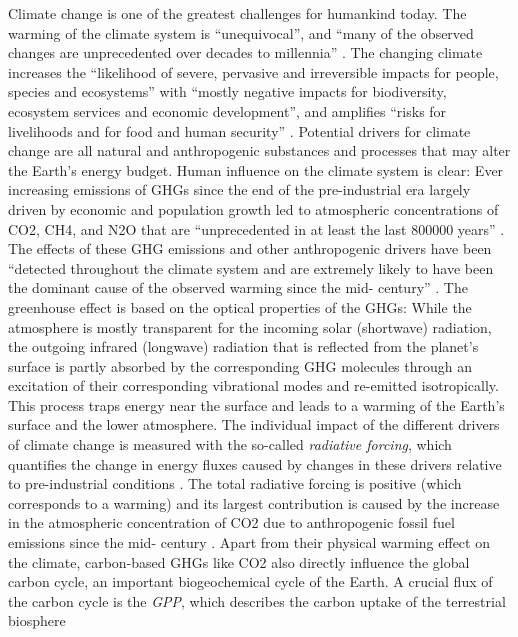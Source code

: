 Climate change is one of the greatest challenges for humankind today. The
warming of the climate system is \enquote{unequivocal}, and \enquote{many of
  the observed changes are unprecedented over decades to millennia}
\autocite{IPCC2014}. The changing climate increases the \enquote{likelihood of
  severe, pervasive and irreversible impacts for people, species and
  ecosystems} with \enquote{mostly negative impacts for biodiversity, ecosystem
services and economic development}, and amplifies \enquote{risks for
livelihoods and for food and human security} \autocite{IPCC2014}. Potential
drivers for climate change are all natural and anthropogenic substances and
processes that may alter the Earth's energy budget. Human influence on the
climate system is clear: Ever increasing emissions of \acp{GHG} since the end
of the pre-industrial era largely driven by economic and population growth
led to atmospheric concentrations of \ac{CO2}, \ac{CH4}, and \ac{N2O} that
are \enquote{unprecedented in at least the last 800000 years}
\autocite{IPCC2014}. The effects of these \ac{GHG} emissions and other
anthropogenic drivers have been \enquote{detected throughout the climate
system and are extremely likely to have been the dominant cause of the
observed warming since the mid- century} \autocite{IPCC2014}. The
greenhouse effect is based on the optical properties of the \acp{GHG}: While
the atmosphere is mostly transparent for the incoming solar (shortwave)
radiation, the outgoing infrared (longwave) radiation that is reflected from
the planet's surface is partly absorbed by the corresponding \ac{GHG}
molecules through an excitation of their corresponding vibrational modes and
re-emitted isotropically. This process traps energy near the surface and
leads to a warming of the Earth's surface and the lower atmosphere. The
individual impact of the different drivers of climate change is measured with
the so-called \emph{radiative forcing}, which quantifies the change in energy
fluxes caused by changes in these drivers relative to pre-industrial
conditions \autocite{IPCC2013}. The total radiative forcing is positive
(which corresponds to a warming) and its largest contribution is caused by
the increase in the atmospheric concentration of \ac{CO2} due to anthropogenic
fossil fuel emissions since the mid- century \autocite{IPCC2014}. Apart
from their physical warming effect on the climate, carbon-based \acp{GHG} like
\ac{CO2} also directly influence the global carbon cycle, an important
biogeochemical cycle of the Earth. A crucial flux of the carbon cycle is the
\emph{\ac{GPP}}, which describes the carbon uptake of the terrestrial biosphere
